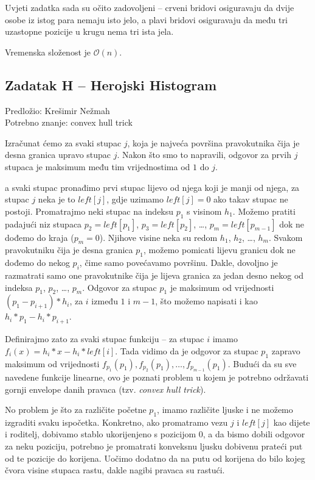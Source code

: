 \documentclass[a4paper]{article}
\begin{document}
Uvjeti zadatka sada su očito zadovoljeni -- crveni bridovi osiguravaju da dvije
osobe iz istog para nemaju isto jelo, a plavi bridovi osiguravaju da među tri
uzastopne pozicije u krugu nema tri ista jela.

Vremenska složenost je $\mathcal{O}(n)$.

\clearpage

\subsection*{Zadatak H -- Herojski Histogram}
\textsf{Predložio: Krešimir Nežmah}\\
\textsf{Potrebno znanje: convex hull trick}

Izračunat ćemo za svaki stupac $j$, koja je najveća površina pravokutnika čija
je desna granica upravo stupac $j$. Nakon što smo to napravili, odgovor za prvih
$j$ stupaca je maksimum među tim vrijednostima od $1$ do $j$.

a svaki stupac pronađimo prvi stupac lijevo od njega koji je manji od njega, za
stupac $j$ neka je to $left[j]$, gdje uzimamo $left[j] = 0$ ako takav stupac ne
postoji. Promatrajmo neki stupac na indeksu $p_1$ s visinom $h_1$. Možemo
pratiti padajući niz stupaca $p_2 = left[p_1]$, $p_3 = left[p_2]$, \dots,
$p_m = left[p_{m-1}]$ dok ne dođemo do kraja ($p_m = 0$). Njihove visine neka su
redom $h_1$, $h_2$, \dots, $h_m$. Svakom pravokutniku čija je desna granica
$p_1$, možemo pomicati lijevu granicu dok ne dođemo do nekog $p_i$, čime samo
povećavamo površinu. Dakle, dovoljno je razmatrati samo one pravokutnike čija je
lijeva granica za jedan desno nekog od indeksa $p_1$, $p_2$, \dots, $p_m$.
Odgovor za stupac $p_1$ je maksimum od vrijednosti $(p_1 - p_{i+1}) * h_i$, za
$i$ između $1$ i $m-1$, što možemo napisati i kao $h_i * p_1 - h_i * p_{i+1}$.

Definirajmo zato za svaki stupac funkciju -- za stupac $i$ imamo
$f_i(x) = h_i * x - h_i * left[i]$. Tada vidimo da je odgovor za stupac $p_1$
zapravo maksimum od vrijednosti $f_{p_1}(p_1), f_{p_2}(p_1), \dots, f_{p_{m-1}} (p_1)$.
Budući da su sve navedene funkcije linearne, ovo je poznati problem u kojem je
potrebno održavati gornji envelope danih pravaca (tzv. \textit{convex hull trick}).

No problem je što za različite početne $p_1$, imamo različite ljuske i ne
možemo izgraditi svaku ispočetka. Konkretno, ako promatramo vezu $j$ i $left[j]$
kao dijete i roditelj, dobivamo stablo ukorijenjeno s pozicijom $0$, a da bismo
dobili odgovor za neku poziciju, potrebno je promatrati konveksnu ljusku dobivenu
prateći put od te pozicije do korijena. Uočimo dodatno da na putu od korijena do
bilo kojeg čvora visine stupaca rastu, dakle nagibi pravaca su rastući.
\end{document}
